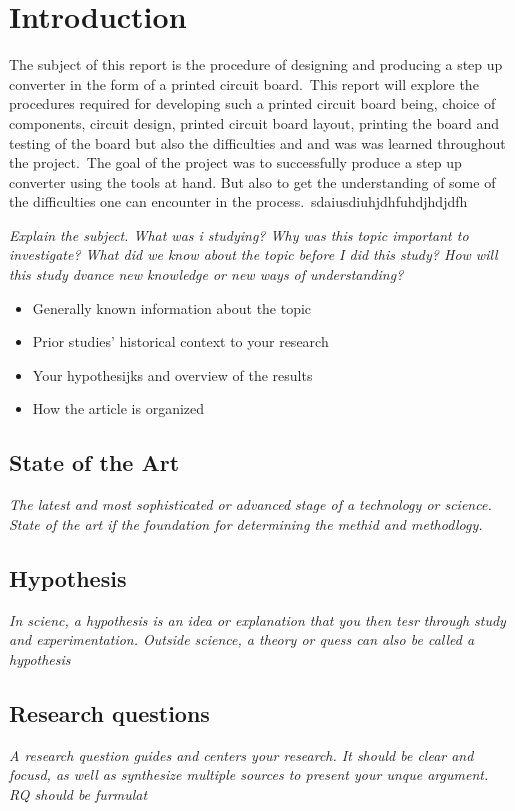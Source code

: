 
\section{Introduction}
The subject of this report is the procedure of designing and producing a step up converter in the form of a printed circuit board.\
This report will explore the procedures required for developing such a printed circuit board being, choice of components, circuit design, printed circuit board layout, printing the board and testing of the board but also the difficulties and and was was learned throughout the project.\ 
The goal of the project was to successfully produce a step up converter using the tools at hand. But also to get the understanding of some of the difficulties one can encounter in the process.\
sdaiusdiuhjdhfuhdjhdjdfh

\textit{Explain the subject. What was i studying? Why was this topic important to investigate? What did we know about the topic before I did this study? How will this study dvance new knowledge or new ways of understanding?}
\begin{itemize}
    \item Generally known information about the topic
    \item Prior studies' historical context to your research
    \item Your hypothesijks and overview of the results
    \item How the article is organized
\end{itemize}
\subsection{State of the Art}
\textit{The latest and most sophisticated or advanced stage of a technology or science. State of the art if the foundation for determining the methid and methodlogy.}
\subsection{Hypothesis}
\textit{In scienc, a hypothesis is an idea or explanation that you then tesr through study and experimentation. Outside science, a theory or quess can also be called a hypothesis}
\subsection{Research questions}
\textit{A research question guides and centers your research. It should be clear and focusd, as well as synthesize multiple sources to present your unque argument. RQ should be furmulat}
